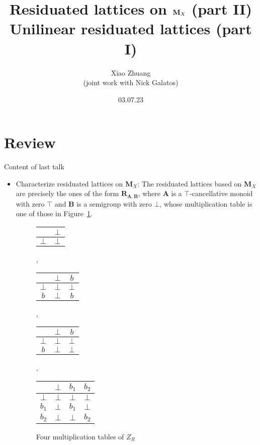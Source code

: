 \documentclass[professionalfont, handout, 10pt]{beamer} %
\title[Algebraic logic presentation 2]{Residuated lattices on ${\mathbf {M} }_X$ (part II)\\
Unilinear residuated lattices (part I)}
\author[Xiao Zhuang]{Xiao Zhuang\\
  \small{(joint work with Nick Galatos)} }
\institute[University of Denver]
{University of Denver}
\date{03.07.23}
\theoremstyle{plain}
\theoremstyle{definition}
\begin{document}


\begin{frame}[plain]{}
\hsize\textwidth
\columnwidth\textwidth
\maketitle

\end{frame}

\section{Review}

\begin{frame}{Content of last talk}
    \begin{itemize}
        \item Characterize residuated lattices on $\mathbf{M}_X$:
        The residuated lattices based on $\mathbf{M}_X$ are precisely the ones of the form $\mathbf{R}_{\mathbf{A}, \mathbf{B}}$, where $\mathbf{A}$ is a $\top$-cancellative monoid with zero $\top$ and $\mathbf{B}$ is a semigroup with zero $\bot$, whose multiplication table is one of those in Figure~\ref{f:4tables}.

        \begin{figure}[h]
            \begin{center}
\begin{tabular}{c | c}
 & $\bot$\\
\hline
$\bot$ & $\bot$ 
\end{tabular}
,
\begin{tabular}{c | c c}
 & $\bot$ & $b$\\
\hline
$\bot$ & $\bot$ & $\bot$\\
$b$ & $\bot$ & $b$
\end{tabular}
,
\begin{tabular}{c | c c}
 & $\bot$ & $b$\\
\hline
$\bot$ & $\bot$ & $\bot$\\
$b$ & $\bot$ & $\bot$
\end{tabular}
,
\begin{tabular}{c | c c c}
 & $\bot$ & $b_1$ & $b_2$\\
\hline
$\bot$ & $\bot$ & $\bot$ & $\bot$\\
$b_1$ & $\bot$ & $b_1$ & $\bot$\\
$b_2$ & $\bot$ & $\bot$ & $b_2$ 	
\end{tabular}
\end{center}
            \caption{Four multiplication tables of $Z_R$}
            \label{f:4tables}
        \end{figure}
    \end{itemize}
\end{frame}
\end{document}
